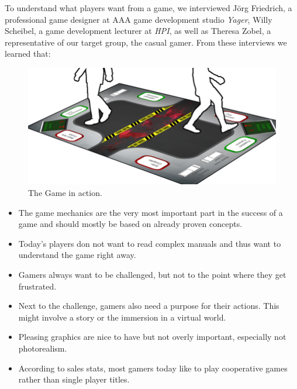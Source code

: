 \documentclass{sigchi}
\begin{document}
To understand what players want from a game, we interviewed J\"org Friedrich, a professional game designer at AAA game development studio \textit{Yager}, Willy Scheibel, a game development lecturer at \textit{HPI}, as well as Theresa Zobel, a representative of our target group, the casual gamer. From these interviews we learned that:

\begin{figure}[H]
\centering
\includegraphics[width=0.99\columnwidth]{walkthrough/totale2}
\caption{The Game in action.}
\label{fig:figure1}
\end{figure}

\begin{itemize}
\item The game mechanics are the very most important part in the success of a game and should mostly be based on already proven concepts.
\item Today's players don not want to read complex manuals and thus want to understand the game right away.
\item Gamers always want to be challenged, but not to the point where they get frustrated.
\item Next to the challenge, gamers also need a purpose for their actions. This might involve a story or the immersion in a virtual world.
\item Pleasing graphics are nice to have but not overly important, especially not photorealism.
\item According to sales stats, most gamers today like to play cooperative games rather than single player titles.
\end{itemize}

\vspace{4mm}
\end{document}
